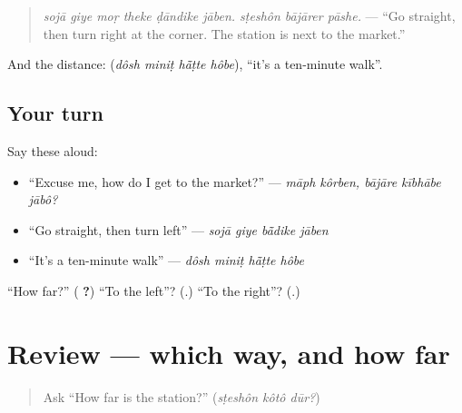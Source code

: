 \begin{quote}
\textbf{        }
\end{quote}

\begin{quote}
\emph{sojā giye moṛ theke ḍāndike jāben. sṭeshôn bājārer pāshe.} — \textquotedblleft{}Go straight, then turn right at the corner. The station is next to the market.\textquotedblright{}
\end{quote}

And the distance: \textbf{   } (\emph{dôsh miniṭ hā̃ṭte hôbe}), \textquotedblleft{}it's a ten-minute walk\textquotedblright{}.

\subsection*{Your turn}
Say these aloud:

\begin{itemize}
\raggedright
  \item \textquotedblleft{}Excuse me, how do I get to the market?\textquotedblright{} — \emph{māph kôrben, bājāre kībhābe jābô?}
  \item \textquotedblleft{}Go straight, then turn left\textquotedblright{} — \emph{sojā giye bā̃dike jāben}
  \item \textquotedblleft{}It's a ten-minute walk\textquotedblright{} — \emph{dôsh miniṭ hā̃ṭte hôbe}
\end{itemize}

\begin{tcolorbox}[breakable,colback=teal!4,colframe=teal!35!black,title={Before you move on}]
\textquotedblleft{}How far?\textquotedblright{} (\textbf{ ?}) \textquotedblleft{}To the left\textquotedblright{}? (\textbf{}.) \textquotedblleft{}To the right\textquotedblright{}? (\textbf{}.)
\end{tcolorbox}
\section[(review)]{Review — which way, and how far}

\label{lesson:BN-R270-asking-the-way}



\begin{quote}
Ask \textquotedblleft{}How far is the station?\textquotedblright{} (\emph{sṭeshôn kôtô dūr?})
\end{quote}

